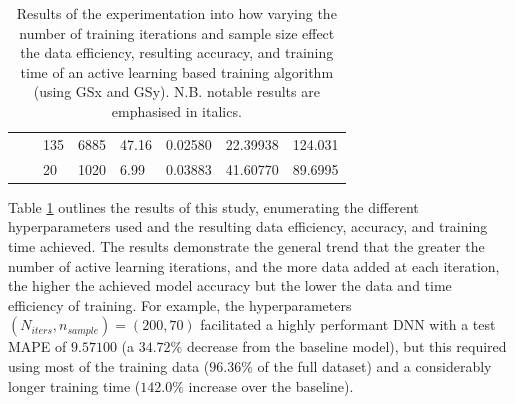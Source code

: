 \documentclass[a4paper, 11pt]{report}
\begin{document}
\begin{table}[ht]
\begin{tabular}{|l|l|l|l|l|l|l|l|}
        \cline{3-8}
                                                                                &                                                                                 & 135                                                                    & 6885                                                                       & 47.16                                                                                            & 0.02580          & 22.39938          & 124.031                                                                       \\ 
        \cline{3-8}
                                                                                &                                                                                 & 20                                                                     & 1020                                                                       & 6.99                                                                                             & 0.03883          & 41.60770          & 89.6995                                                                       \\
        \hline
        \end{tabular}
        \caption{\centering Results of the experimentation into how varying the number of training iterations and sample size effect the data efficiency, resulting accuracy, and training time of an active learning based training algorithm (using GSx and GSy). N.B. notable results are emphasised in italics.}
        \label{table: al-efficiency}
    \end{table}


    Table \ref{table: al-efficiency} outlines the results of this study, enumerating the different hyperparameters used and the resulting data efficiency, accuracy, and training time achieved. The results demonstrate the general trend that the greater the number of active learning iterations, and the more data added at each iteration, the higher the achieved model accuracy but the lower the data and time efficiency of training. For example, the hyperparameters $(N_{iters}, n_{sample}) = (200, 70)$ facilitated a highly performant DNN with a test MAPE of $9.57100$ (a $34.72\%$ decrease from the baseline model), but this required using most of the training data ($96.36\%$ of the full dataset) and a considerably longer training time ($142.0\%$ increase over the baseline).
\end{document}
